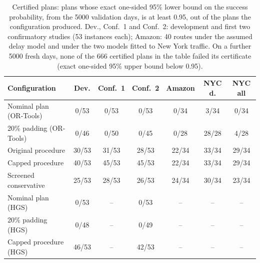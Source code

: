 \begin{table}[t]
\centering
\small
\setlength{\tabcolsep}{4pt}
\caption{Certified plans: plans whose exact one-sided 95\% lower bound on the success probability, from the 5000 validation days, is at least 0.95, out of the plans the configuration produced. Dev., Conf.~1 and Conf.~2: development and first two confirmatory studies (53 instances each); Amazon: 40 routes under the assumed delay model and under the two models fitted to New York traffic. On a further 5000 fresh days, none of the 666 certified plans in the table failed its certificate (exact one-sided 95\% upper bound below 0.95).}
\label{tab:certify}
\begin{tabular}{@{}lcccccc@{}}
\toprule
Configuration & Dev. & Conf.\ 1 & Conf.\ 2 & Amazon & NYC d. & NYC all\\
\midrule
Nominal plan (OR-Tools) & 0/53 & 0/53 & 0/53 & 0/34 & 3/34 & 0/34\\
20\% padding (OR-Tools) & 0/46 & 0/50 & 0/45 & 0/28 & 28/28 & 4/28\\
Original procedure & 30/53 & 31/53 & 28/53 & 22/34 & 33/34 & 29/34\\
Capped procedure & 40/53 & 45/53 & 45/53 & 22/34 & 33/34 & 29/34\\
Screened conservative & 25/53 & 28/53 & 26/53 & 24/34 & 30/34 & 23/34\\
Nominal plan (HGS) & 0/53 & -- & 0/53 & -- & -- & --\\
20\% padding (HGS) & 0/48 & -- & 0/49 & -- & -- & --\\
Capped procedure (HGS) & 46/53 & -- & 42/53 & -- & -- & --\\
\bottomrule
\end{tabular}
\end{table}
